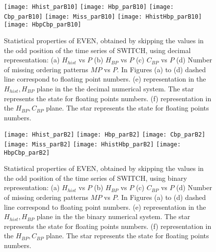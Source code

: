 \begin{figure}
\texttt{[image: Hhist\_parB10]}
\texttt{[image: Hbp\_parB10]}
\texttt{[image: Cbp\_parB10]}
\texttt{[image: Miss\_parB10]}
\texttt{[image: HhistHbp\_parB10]}
\texttt{[image: HbpCbp\_parB10]}
\caption{Statistical properties of EVEN, obtained by skipping the values in the odd position of the time series of  SWITCH,  using decimal representation: (a) $H_{hist}$ vs $P$ (b) $H_{BP}$ vs $P$ (c) $C_{BP}$ vs $P$ (d) Number of missing ordering patterns $MP$ vs $P$. In Figures (a) to (d) dashed line correspond to floating point numbers. (e) representation in the $H_{hist},H_{BP}$ plane in the the decimal numerical system.  The star represents the state for floating points numbers. (f) representation in the $H_{BP},C_{BP}$ plane.  The star represents the state for floating points numbers. } \label{fig:seqpardec}
\end{figure}

\begin{figure}
\texttt{[image: Hhist\_parB2]}
\texttt{[image: Hbp\_parB2]}
\texttt{[image: Cbp\_parB2]}
\texttt{[image: Miss\_parB2]}
\texttt{[image: HhistHbp\_parB2]}
\texttt{[image: HbpCbp\_parB2]}
\caption{Statistical properties of EVEN, obtained by skipping the values in the odd position of the time series of  SWITCH,  using binary representation: (a) $H_{hist}$ vs $P$ (b) $H_{BP}$ vs $P$ (c) $C_{BP}$ vs $P$ (d) Number of missing ordering patterns $MP$ vs $P$. In Figures (a) to (d) dashed line correspond to floating point numbers. (e) representation in the $H_{hist},H_{BP}$ plane in the the binary numerical system.  The star represents the state for floating points numbers. (f) representation in the $H_{BP},C_{BP}$ plane.  The star represents the state for floating points numbers.  } \label{fig:seqparbin}
\end{figure}

